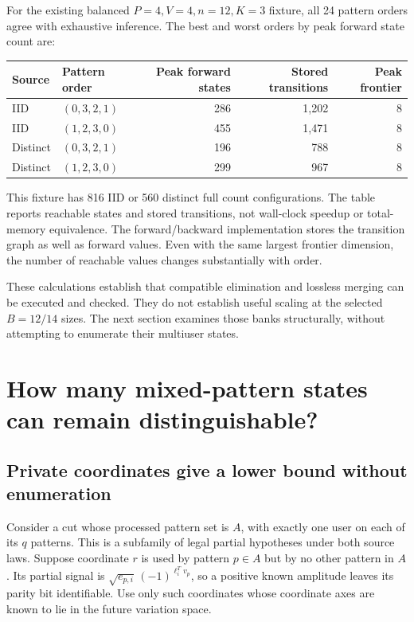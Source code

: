 \documentclass[10pt,a4paper]{article}
\begin{document}
For the existing balanced $P=4,V=4,n=12,K=3$ fixture, all 24 pattern orders agree with exhaustive inference.
The best and worst orders by peak forward state count are:
\begin{center}
\begin{tabular}{@{}llrrr@{}}\toprule
Source & Pattern order & Peak forward states & Stored transitions & Peak frontier\\\midrule
IID & $(0,3,2,1)$ & 286 & 1,202 & 8\\
IID & $(1,2,3,0)$ & 455 & 1,471 & 8\\
Distinct & $(0,3,2,1)$ & 196 & 788 & 8\\
Distinct & $(1,2,3,0)$ & 299 & 967 & 8\\\bottomrule
\end{tabular}
\end{center}
This fixture has 816 IID or 560 distinct full count configurations.
The table reports reachable states and stored transitions, not wall-clock speedup or total-memory equivalence.
The forward/backward implementation stores the transition graph as well as forward values.
Even with the same largest frontier dimension, the number of reachable values changes substantially with order.

These calculations establish that compatible elimination and lossless merging can be executed and checked.
They do not establish useful scaling at the selected $B=12/14$ sizes. The next section examines those banks
structurally, without attempting to enumerate their multiuser states.

\clearpage
\section{How many mixed-pattern states can remain distinguishable?}
\label{sec:mixed-state-counts}
\subsection{Private coordinates give a lower bound without enumeration}
Consider a cut whose processed pattern set is $A$, with exactly one user on each of its $q$ patterns.
This is a subfamily of legal partial hypotheses under both source laws. Suppose coordinate $r$ is used by
pattern $p\in A$ but by no other pattern in $A$. Its partial signal is
$\sqrt{e_{p,i}}\,(-1)^{\ell_i^Tv_p}$, so a positive known amplitude leaves its parity bit identifiable.
Use only such coordinates whose coordinate axes are known to lie in the future variation space.
\end{document}
